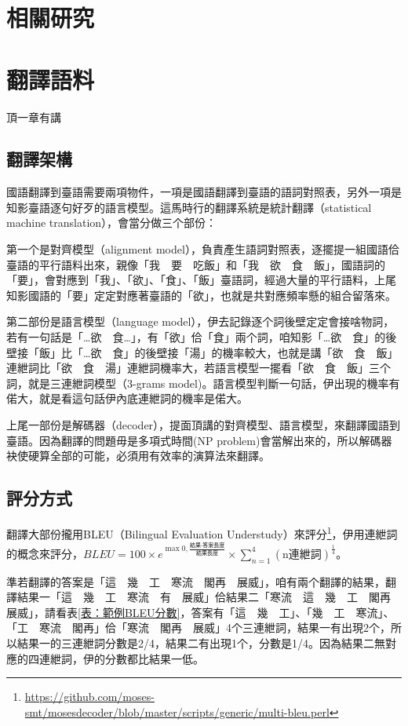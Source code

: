 \documentclass[final,oneside,onecolumn,12pt,a4paper]{book}%
\begin{document}
\chapter{相關研究}
\label{章：相關研究}


\chapter{翻譯語料}
\label{章：翻譯語料}

頂一章有講

\section{翻譯架構}
\label{節：翻譯架構}
國語翻譯到臺語需要兩項物件，一項是國語翻譯到臺語的語詞對照表，另外一項是知影臺語逐句好歹的語言模型。這馬時行的翻譯系統是統計翻譯（statistical machine translation），會當分做三个部份：

第一个是對齊模型（alignment model），負責產生語詞對照表，逐擺提一組國語佮臺語的平行語料出來，親像「我　要　吃飯」和「我　欲　食　飯」，國語詞的「要」，會對應到「我」、「欲」、「食」、「飯」臺語詞，經過大量的平行語料，上尾知影國語的「要」定定對應著臺語的「欲」，也就是共對應頻率懸的組合留落來。

第二部份是語言模型（language model），伊去記錄逐个詞後壁定定會接啥物詞，若有一句話是「…欲　食…」，有「欲」佮「食」兩个詞，咱知影「…欲　食」的後壁接「飯」比「…欲　食」的後壁接「湯」的機率較大，也就是講「欲　食　飯」連紲詞比「欲　食　湯」連紲詞機率大，若語言模型一擺看「欲　食　飯」三个詞，就是三連紲詞模型（3-grams model)。語言模型判斷一句話，伊出現的機率有偌大，就是看這句話伊內底連紲詞的機率是偌大。

上尾一部份是解碼器（decoder），提面頂講的對齊模型、語言模型，來翻譯國語到臺語。因為翻譯的問題毋是多項式時間(NP problem)會當解出來的，所以解碼器袂使硬算全部的可能，必須用有效率的演算法來翻譯。

\section{評分方式}
\label{節：評分方式}

翻譯大部份攏用BLEU（Bilingual Evaluation Understudy）來評分\footnote{\url{https://github.com/moses-smt/mosesdecoder/blob/master/scripts/generic/multi-bleu.perl}}，伊用連紲詞的概念來評分，$BLEU=100\times{e^{\max{0,\frac{\textit{結果-答案長度}}{\textit{結果長度}}}}}\times{\sum_{n=1}^{4}(\textrm{n連紲詞})^{\frac{1}{4}}}$。

準若翻譯的答案是「這　幾　工　寒流　閣再　展威」，咱有兩个翻譯的結果，翻譯結果一「這　幾　工　寒流　有　展威」佮結果二「寒流　這　幾　工　閣再　展威」，請看表\ref{表：範例BLEU分數}，答案有「這　幾　工」、「幾　工　寒流」、「工　寒流　閣再」佮「寒流　閣再　展威」4个三連紲詞，結果一有出現2个，所以結果一的三連紲詞分數是2/4，結果二有出現1个，分數是1/4。因為結果二無對應的四連紲詞，伊的分數都比結果一低。
\end{document}
